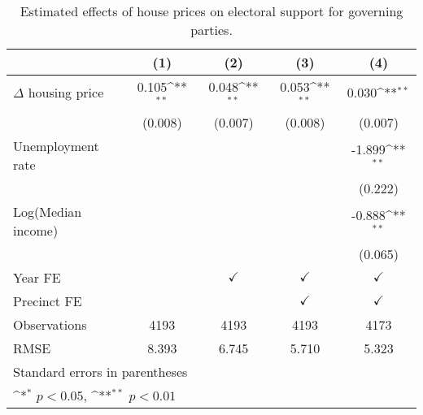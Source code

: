 \begin{table}[htbp]\centering
\def\sym#1{\ifmmode^{#1}\else\(^{#1}\)\fi}
\caption{Estimated effects of house prices on electoral support for governing parties.} \label{predv}
\begin{tabular}{l*{4}{c}}
\hline\hline
                    &\multicolumn{1}{c}{(1)}        &\multicolumn{1}{c}{(2)}        &\multicolumn{1}{c}{(3)}        &\multicolumn{1}{c}{(4)}        \\
\hline
$\Delta$ housing price&       0.105\sym{**}&       0.048\sym{**}&       0.053\sym{**}&       0.030\sym{**}\\
                    &     (0.008)        &     (0.007)        &     (0.008)        &     (0.007)        \\
[1em]
Unemployment rate   &                    &                    &                    &      -1.899\sym{**}\\
                    &                    &                    &                    &     (0.222)        \\
[1em]
Log(Median income)  &                    &                    &                    &      -0.888\sym{**}\\
                    &                    &                    &                    &     (0.065)        \\
[1em]
\hline Year FE      &                    &$\checkmark$        &$\checkmark$        &$\checkmark$        \\
[1em]
Precinct FE         &                    &                    &$\checkmark$        &$\checkmark$        \\
\hline
Observations        &        4193        &        4193        &        4193        &        4173        \\
RMSE                &       8.393        &       6.745        &       5.710        &       5.323        \\
\hline\hline
\multicolumn{5}{l}{\footnotesize Standard errors in parentheses}\\
\multicolumn{5}{l}{\footnotesize \sym{*} \(p<0.05\), \sym{**} \(p<0.01\)}\\
\end{tabular}
\end{table}
